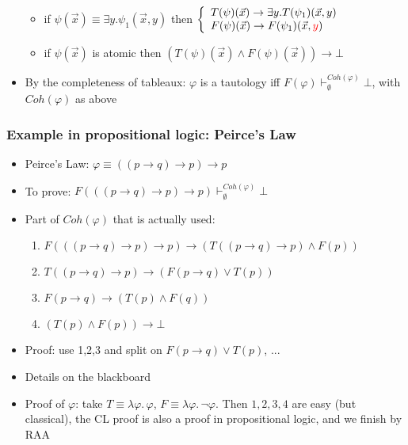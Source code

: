 \documentclass[handout,11pt]{beamer}
\newcommand{\red}[1]{\textcolor{red}{#1}}
\newcommand{\imp}{\rightarrow}
\begin{document}
\begin{frame}
\begin{itemize}[<+->]
\begin{itemize}
\item

 if $\psi(\vec{x})\equiv\exists y.\psi_1(\vec{x},y)$ then 
$\left\{\begin{array}{ll}
T(\psi)(\vec{x})\to \exists y.T(\psi_1)(\vec{x},y)\\
F(\psi)(\vec{x})\to F(\psi_1)(\vec{x},\red{y})
\end{array}\right.$

\item
 if $\psi(\vec{x})$ is atomic then 
 $(T(\psi)(\vec{x})\wedge F(\psi)(\vec{x})) \to \bot$
 \end{itemize} 
 \item By the completeness of tableaux: $\varphi$ is a tautology iff
 $F(\varphi)\vdash^{Coh(\varphi)}_\emptyset \bot$, 
 with $Coh(\varphi)$ as above
 \end{itemize} 
\end{frame}

\begin{frame}
\frametitle{Example in propositional logic: Peirce's Law}
 \begin{itemize}[<+->] 
    \item Peirce's Law: $\varphi\equiv((p\imp q)\imp p)\imp p$
    \item To prove: $F(((p\imp q)\imp p)\imp p) 
    \vdash^{Coh(\varphi)}_\emptyset\bot$    
    \item Part of $Coh(\varphi)$ that is actually used:
    \begin{enumerate}[<+->]
    	\item $F(((p\imp q)\imp p)\imp p) \imp (T((p\imp q)\imp p) \wedge F(p))$
    	\item $T((p\imp q)\imp p) \imp (F(p\imp q) \vee T(p))$
    	\item $F(p\imp q) \imp (T(p) \wedge F(q))$
    	\item $(T(p) \wedge F(p)) \imp \bot$
    \end{enumerate}
    \item Proof: use 1,2,3 and split on $F(p\imp q) \vee T(p)$, ...
    \item Details on the blackboard
    \item Proof of $\varphi$: take $T\equiv\lambda\varphi.\,\varphi$,
     $F\equiv\lambda\varphi.\,\neg\varphi$. Then $1,2,3,4$ are easy
     (but classical), the CL proof is also a proof 
     in propositional logic, and we finish by RAA
 \end{itemize}
\end{frame}
\end{document}
